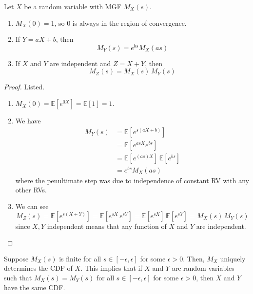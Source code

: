     \begin{lemma}
      Let $X$ be a random variable with MGF $M_X (s)$. 
      \begin{enumerate}
        \item $M_X (0) = 1$, so $0$ is always in the region of convergence. 
        \item If $Y = a X + b$, then 
        \begin{equation}
          M_Y (s) = e^{b s} M_X (a s)
        \end{equation}
        \item If $X$ and $Y$ are independent and $Z = X + Y$, then 
        \begin{equation}
          M_Z (s) = M_X (s) \, M_Y (s)
        \end{equation}
      \end{enumerate}
    \end{lemma}
    \begin{proof}
      Listed. 
      \begin{enumerate}
        \item $M_X (0) = \mathbb{E}[e^{0 X}] = \mathbb{E}[1] = 1$. 
        \item We have 
        \begin{align*}
          M_Y (s) & = \mathbb{E} [e^{s(a X + b)}] \\
          & = \mathbb{E}[ e^{a s X } e^{b s}] \\
          & = \mathbb{E}[e^{(as) X}] \, \mathbb{E}[e^{b s}] \\
          & = e^{b s} M_X (a s)
        \end{align*}
        where the penultimate step was due to independence of constant RV with any other RVs. 
        \item We can see 
        \begin{equation}
          M_Z (s) = \mathbb{E}[ e^{s (X + Y)}] = \mathbb{E}[e^{s X} \, e^{s Y}] = \mathbb{E}[e^{s X}] \, \mathbb{E}[e^{s Y}] = M_X (s) \, M_Y (s)
        \end{equation}
        since $X, Y$ independent means that any function of $X$ and $Y$ are independent. 
      \end{enumerate}
    \end{proof}

    \begin{theorem}
      Suppose $M_X (s)$ is finite for all $s \in [-\epsilon, \epsilon]$ for some $\epsilon > 0$. Then, $M_X$ uniquely determines the CDF of $X$. This implies that if $X$ and $Y$ are random variables such that $M_X (s) = M_Y (s)$ for all $s \in [-\epsilon, \epsilon]$ for some $\epsilon > 0$, then $X$ and $Y$ have the same CDF. 
    \end{theorem}


